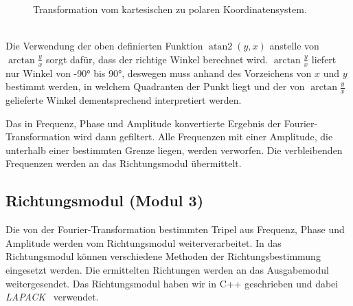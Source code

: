 \begin{minipage}{0.49\textwidth}
    \begin{figure}[H]
        \centering
        \hspace*{-2cm}
        \caption{Transformation vom kartesischen zu polaren Koordinatensystem\label{fig:polarconvert}.}
    \end{figure}
\vspace{10pt}
\end{minipage}
\\
Die Verwendung der oben definierten Funktion $\operatorname{atan2}(y,x)$ anstelle von $\arctan\frac{y}{x}$ sorgt dafür, dass der richtige Winkel berechnet wird. $\arctan\frac{y}{x}$ liefert nur Winkel von \ang{-90} bis \ang{90}, deswegen muss anhand des Vorzeichens von $x$ und $y$ bestimmt werden, in welchem Quadranten der Punkt liegt und der von $\arctan\frac{y}{x}$ gelieferte Winkel dementsprechend interpretiert werden.

Das in Frequenz, Phase und Amplitude konvertierte Ergebnis der Fourier-Transformation wird dann gefiltert. Alle Frequenzen mit einer Amplitude, die unterhalb einer bestimmten Grenze liegen, werden verworfen. Die verbleibenden Frequenzen werden an das Richtungsmodul übermittelt.

\subsection{Richtungsmodul (Modul 3)}
Die von der Fourier-Transformation bestimmten Tripel aus Frequenz, Phase und Amplitude werden vom Richtungsmodul weiterverarbeitet. In das Richtungsmodul können verschiedene Methoden der Richtungsbestimmung eingesetzt werden. Die ermittelten Richtungen werden an das Ausgabemodul weitergesendet.
Das Richtungsmodul haben wir in C++ geschrieben und dabei \textit{LAPACK}~\cite{Anderson:1990:LPL:110382.110385} verwendet.
